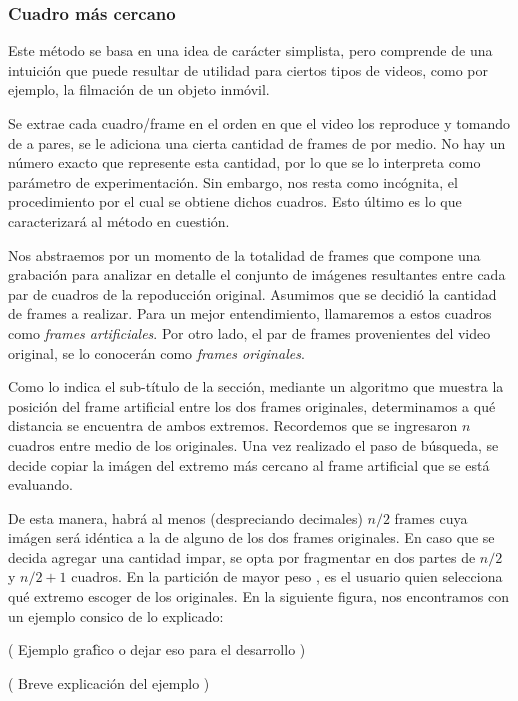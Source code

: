 \subsubsection{Cuadro m\'as cercano}

Este m\'etodo se basa en una idea de car\'acter simplista, pero comprende de una intuici\'on que puede resultar de utilidad para ciertos tipos de videos, como por ejemplo, la filmaci\'on de un objeto inm\'ovil.

Se extrae cada cuadro/frame en el orden en que el video los reproduce y tomando de a pares, se le adiciona una cierta cantidad de frames de por medio. No hay un n\'umero exacto que represente esta cantidad, por lo que se lo interpreta como par\'ametro de experimentaci\'on. Sin embargo, nos resta como inc\'ognita, el procedimiento por el cual se obtiene dichos cuadros. Esto \'ultimo es lo que caracterizar\'a al m\'etodo en cuesti\'on.

Nos abstraemos por un momento de la totalidad de frames que compone una grabaci\'on para analizar en detalle el conjunto de im\'agenes resultantes entre cada par de cuadros de la repoducci\'on original. Asumimos que se decidi\'o la cantidad de frames a realizar. Para un mejor entendimiento, llamaremos a estos cuadros como \textit{frames artificiales}. Por otro lado, el par de frames provenientes del video original, se lo conocer\'an como \textit{frames originales}.

Como lo indica el sub-t\'itulo de la secci\'on, mediante un algoritmo que muestra la posici\'on del frame artificial entre los dos frames originales, determinamos a qu\'e distancia se encuentra de ambos extremos. Recordemos que se ingresaron $n$ cuadros entre medio de los originales. Una vez realizado el paso de b\'usqueda, se decide copiar la im\'agen del extremo m\'as cercano al frame artificial que se est\'a evaluando. 

De esta manera, habr\'a al menos (despreciando decimales) $n/2$  frames cuya im\'agen ser\'a id\'entica a la de alguno de los dos frames originales. En caso que se decida agregar una cantidad impar, se opta por fragmentar en dos partes de $n/2$ y $n/2+1$ cuadros. En la partici\'on de mayor peso
, es el usuario quien selecciona qu\'e extremo escoger de los originales. En la siguiente figura, nos encontramos con un ejemplo consico de lo explicado: 

( Ejemplo gra\'fico o dejar eso para el desarrollo )

( Breve explicaci\'on del ejemplo )

